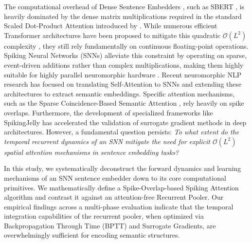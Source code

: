 \documentclass[10pt]{article} %
\begin{document}
The computational overhead of Dense Sentence Embedders \citep{devlin2018bert}, such as SBERT \citep{reimers2019sentence}, is heavily dominated by the dense matrix multiplications required in the standard Scaled Dot-Product Attention introduced by \citet{vaswani2017attention}. While numerous efficient Transformer architectures have been proposed to mitigate this quadratic $\mathcal{O}(L^2)$ complexity \citep{tay2022efficient}, they still rely fundamentally on continuous floating-point operations. Spiking Neural Networks (SNNs) alleviate this constraint by operating on sparse, event-driven additions rather than complex multiplications, making them highly suitable for highly parallel neuromorphic hardware \citep{roy2019towards}. Recent neuromorphic NLP research has focused on translating Self-Attention to SNNs \citep{li2022spikeformer, zhu2023spikegpt} and extending these architectures to extract semantic embeddings. Specific attention mechanisms, such as the Sparse Coincidence-Based Semantic Attention \citep{coincidence2026}, rely heavily on spike overlaps. Furthermore, the development of specialized frameworks like SpikingJelly \citep{fang2023spikingjelly} has accelerated the validation of surrogate gradient methods in deep architectures. However, a fundamental question persists: \textit{To what extent do the temporal recurrent dynamics of an SNN mitigate the need for explicit $\mathcal{O}(L^2)$ spatial attention mechanisms in sentence embedding tasks?}

In this study, we systematically deconstruct the forward dynamics and learning mechanisms of an SNN sentence embedder down to its core computational primitives. We mathematically define a Spike-Overlap-based Spiking Attention algorithm and contrast it against an attention-free Recurrent Pooler. Our empirical findings across a multi-phase evaluation indicate that the temporal integration capabilities of the recurrent pooler, when optimized via Backpropagation Through Time (BPTT) and Surrogate Gradients, are overwhelmingly sufficient for encoding semantic structures.
\end{document}
